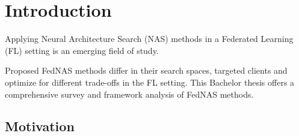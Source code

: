 \chapter{Introduction}\label{chapter:introduction}






Applying Neural Architecture Search (NAS) methods in a Federated Learning (FL) setting is an emerging field of study.

Proposed FedNAS methods differ in their search spaces, targeted clients and optimize for different trade-offs in the FL setting. This Bachelor thesis offers a comprehensive survey and framework analysis of FedNAS methods. 





\section{Motivation}

